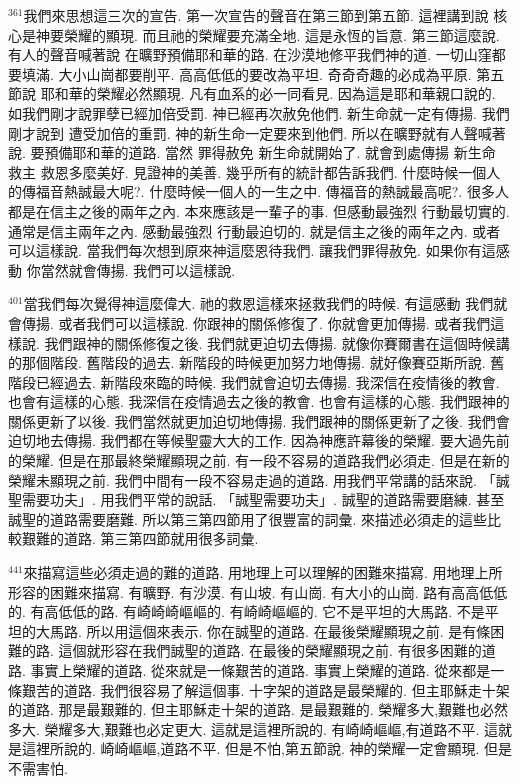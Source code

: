 \documentclass{book}
\begin{document}
$^{361}$我們來思想這三次的宣告.
第一次宣告的聲音在第三節到第五節.
這裡講到說 核心是神要榮耀的顯現.
而且祂的榮耀要充滿全地.
這是永恆的旨意.
第三節這麼說.
有人的聲音喊著說 在曠野預備耶和華的路.
在沙漠地修平我們神的道.
一切山窪都要填滿.
大小山崗都要削平.
高高低低的要改為平坦.
奇奇奇趣的必成為平原.
第五節說 耶和華的榮耀必然顯現.
凡有血系的必一同看見.
因為這是耶和華親口說的.
如我們剛才說罪孽已經加倍受罰.
神已經再次赦免他們.
新生命就一定有傳揚.
我們剛才說到 遭受加倍的重罰.
神的新生命一定要來到他們.
所以在曠野就有人聲喊著說.
要預備耶和華的道路.
當然 罪得赦免 新生命就開始了.
就會到處傳揚 新生命 救主 救恩多麼美好.
見證神的美善.
幾乎所有的統計都告訴我們.
什麼時候一個人的傳福音熱誠最大呢?.
什麼時候一個人的一生之中.
傳福音的熱誠最高呢?.
很多人都是在信主之後的兩年之內.
本來應該是一輩子的事.
但感動最強烈 行動最切實的.
通常是信主兩年之內.
感動最強烈 行動最迫切的.
就是信主之後的兩年之內.
或者可以這樣說.
當我們每次想到原來神這麼恩待我們.
讓我們罪得赦免.
如果你有這感動 你當然就會傳揚.
我們可以這樣說.

$^{401}$當我們每次覺得神這麼偉大.
祂的救恩這樣來拯救我們的時候.
有這感動 我們就會傳揚.
或者我們可以這樣說.
你跟神的關係修復了.
你就會更加傳揚.
或者我們這樣說.
我們跟神的關係修復之後.
我們就更迫切去傳揚.
就像你賽爾書在這個時候講的那個階段.
舊階段的過去.
新階段的時候更加努力地傳揚.
就好像賽亞斯所說.
舊階段已經過去.
新階段來臨的時候.
我們就會迫切去傳揚.
我深信在疫情後的教會.
也會有這樣的心態.
我深信在疫情過去之後的教會.
也會有這樣的心態.
我們跟神的關係更新了以後.
我們當然就更加迫切地傳揚.
我們跟神的關係更新了之後.
我們會迫切地去傳揚.
我們都在等候聖靈大大的工作.
因為神應許幕後的榮耀.
要大過先前的榮耀.
但是在那最終榮耀顯現之前.
有一段不容易的道路我們必須走.
但是在新的榮耀未顯現之前.
我們中間有一段不容易走過的道路.
用我們平常講的話來說.
「誠聖需要功夫」.
用我們平常的說話.
「誠聖需要功夫」.
誠聖的道路需要磨練.
甚至誠聖的道路需要磨難.
所以第三第四節用了很豐富的詞彙.
來描述必須走的這些比較艱難的道路.
第三第四節就用很多詞彙.

$^{441}$來描寫這些必須走過的難的道路.
用地理上可以理解的困難來描寫.
用地理上所形容的困難來描寫.
有曠野.
有沙漠.
有山坡.
有山崗.
有大小的山崗.
路有高高低低的.
有高低低的路.
有崎崎崎嶇嶇的.
有崎崎嶇嶇的.
它不是平坦的大馬路.
不是平坦的大馬路.
所以用這個來表示.
你在誠聖的道路.
在最後榮耀顯現之前.
是有條困難的路.
這個就形容在我們誠聖的道路.
在最後的榮耀顯現之前.
有很多困難的道路.
事實上榮耀的道路.
從來就是一條艱苦的道路.
事實上榮耀的道路.
從來都是一條艱苦的道路.
我們很容易了解這個事.
十字架的道路是最榮耀的.
但主耶穌走十架的道路.
那是最艱難的.
但主耶穌走十架的道路.
是最艱難的.
榮耀多大,艱難也必然多大.
榮耀多大,艱難也必定更大.
這就是這裡所說的.
有崎崎嶇嶇,有道路不平.
這就是這裡所說的.
崎崎嶇嶇,道路不平.
但是不怕,第五節說.
神的榮耀一定會顯現.
但是不需害怕.
\end{document}
